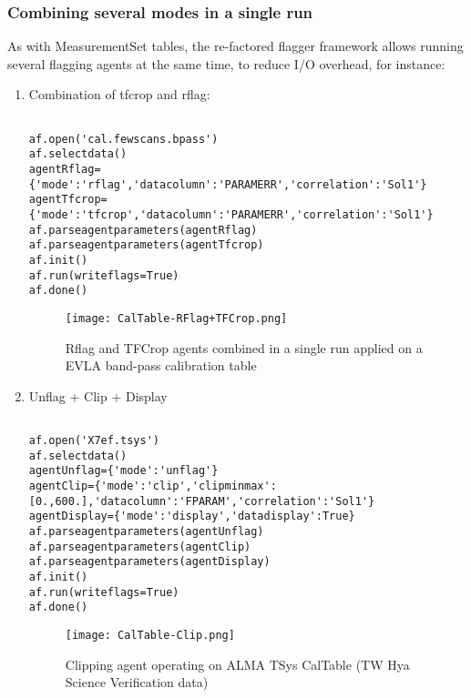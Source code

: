 \subsubsection{Combining several modes in a single run}

As with MeasurementSet tables, the re-factored flagger framework allows running
several flagging agents at the same time, to reduce I/O overhead,  for instance:

\begin{enumerate}

\item Combination of tfcrop and rflag:

\begin{verbatim}

af.open('cal.fewscans.bpass')
af.selectdata()
agentRflag={'mode':'rflag','datacolumn':'PARAMERR','correlation':'Sol1'}
agentTfcrop={'mode':'tfcrop','datacolumn':'PARAMERR','correlation':'Sol1'}
af.parseagentparameters(agentRflag)
af.parseagentparameters(agentTfcrop)
af.init()
af.run(writeflags=True)
af.done()

\end{verbatim}

\begin{figure}
\texttt{[image: CalTable-RFlag+TFCrop.png]}
\caption{Rflag and TFCrop agents combined in a single run applied on a EVLA
band-pass calibration table}
\label{Fig:EVLA Band Pass Cal Table RFlag+TFCrop applied combined}
\end{figure}

\item Unflag + Clip + Display

\begin{verbatim}
  
af.open('X7ef.tsys')
af.selectdata()
agentUnflag={'mode':'unflag'}
agentClip={'mode':'clip','clipminmax':[0.,600.],'datacolumn':'FPARAM','correlation':'Sol1'}
agentDisplay={'mode':'display','datadisplay':True}
af.parseagentparameters(agentUnflag)
af.parseagentparameters(agentClip)
af.parseagentparameters(agentDisplay)
af.init()
af.run(writeflags=True)
af.done()

\end{verbatim}

\begin{figure}
\texttt{[image: CalTable-Clip.png]}
\caption{Clipping agent operating on ALMA TSys CalTable (TW Hya Science
Verification data)}
\label{Fig:TW Hya CalTable Clip}
\end{figure}


\end{enumerate}
